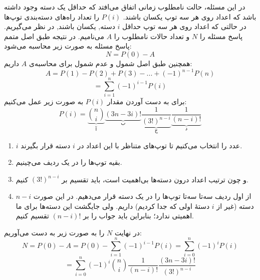     \p
در این مسئله، حالت نامطلوب زمانی اتفاق می‌افتد که حداقل یک دسته‌ وجود داشته باشد که اعداد روی هر سه توپ یکسان باشند.
$P(i)$
را تعداد راه‌های دسته‌بندی توپ‌ها 
در حالتی که
 اعداد روی هر سه توپ حداقل
   $i$
دسته, یکسان باشند, در نظر می‌گیریم. پاسخ مسئله
را $N$
و تعداد حالات نامطلوب را
 $A$ 
 می‌نامیم. در نتیجه طبق اصل متمم پاسخ مسئله به صورت زیر محاسبه‌ می‌شود:
$$N = P(0) - A$$
همچنین طبق اصل شمول و عدم شمول برای محاسبه‌ی 
$A$
داریم:
$$A = P(1) - P(2) + P(3) - ... + (-1)^{n-1}P(n)$$
$$= \sum\limits_{i = 1}^n (-1)^{i-1} P(i)$$
برای به دست آوردن مقدار 
$P(i)$
به صورت زیر عمل می‌کنیم:
$$P(i) = \underbrace{{n  \choose i}}_{\text{آ}}\underbrace{(3n - 3i)!}_{\text{ب}}\underbrace{\frac{1}{(3!)^{n - i}}}_{\text{ج}} \underbrace{\frac{1}{(n - i)!}}_{\text{د}}$$
\begin{enumerate}
	\item 
    	$i$
    	 عدد را انتخاب می‌کنیم تا توپ‌های متناظر با این اعداد در 
    	 $i$
    	  دسته قرار بگیرند.
    	
	\item 
        بقیه توپ‌ها را در یک ردیف می‌چینیم.
    	
	\item 
    	 و چون ترتیب اعداد درون دسته‌ها بی‌اهمیت است، باید تقسیم بر $(3!)^{n-i}$ کنیم.
    	
    \item 
    	 از اول ردیف سه‌تا سه‌تا توپ‌ها را در یک دسته قرار می‌دهیم. در این صورت $n - i$ دسته (غیر از 
    	$i$ 
    	دستهٔ اولی که جدا کردیم) داریم. ولی جایگشت این دسته‌ها برای ما اهمیتی ندارد؛ بنابراین باید جواب را بر $(n-i)!$ تقسیم کنیم.
    
	\end{enumerate}
    در نهایت $N$ 
    را به صورت زیر به دست می‌آوریم:
	$$N = P(0) - A = P(0) - \sum\limits_{i = 1}^n (-1)^{i-1} P(i) = \sum\limits_{i = 0}^n (-1)^{i} P(i)$$
	$$= \sum\limits_{i = 0}^n (-1)^i {n \choose i} \frac{1}{(n - i)!} \frac{(3n - 3i)!}{(3!)^{n - i}}$$

   